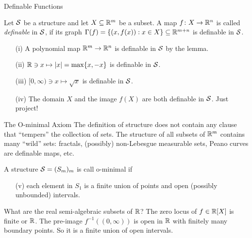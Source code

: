 \documentclass{beamer}
\begin{document}
\begin{frame}{Definable Functions}
  \begin{definition}
    Let ${\mathcal S}$ be a structure and let $X\subseteq{\mathbb{R}}^m$ be a subset.
    A map $f\colon X\rightarrow{\mathbb{R}}^n$ is
    called \emph{definable} in ${\mathcal S}$, if its graph $\Gamma(f) =
    \{(x,f(x)) : x\in X\}\subseteq{\mathbb{R}}^{m+n}$ is definable in ${\mathcal S}$.
  \end{definition}

  \begin{example} 
    \begin{enumerate}
    \item [(i)] A polynomial map ${\mathbb{R}}^m\rightarrow{\mathbb{R}}^n$ is
      definable in ${\mathcal S}$ by the lemma.
    \item[(ii)]  ${\mathbb{R}}\ni x\mapsto |x| =\max\{x,-x\}$ is definable in ${\mathcal S}$.
    \item[(iii)]  $[0,\infty)\ni x\mapsto \sqrt{x}$ is 
      definable in ${\mathcal S}$.
    \item[(iv)] The domain $X$ and the image $f(X)$ are both definable
      in ${\mathcal S}$. Just project!
    \end{enumerate}
  \end{example}
\end{frame}

\begin{frame}{The O-minimal Axiom}  
  The definition of structure does not contain
  any clause that ``tempers'' the collection of sets.
  The structure of all subsets of ${\mathbb{R}}^m$ contains many ``wild'' sets:
  fractals, (possibly) non-Lebesgue measurable sets, Peano curves are
  definable maps, etc.

  \begin{definition}
    A {structure} ${\mathcal S}=(S_m)_m$ is call \alert{o-minimal} if
    \begin{enumerate}
    \item [(v)] each 
      element in $S_1$ is a finite union of points and
      open (possibly unbounded) intervals.
    \end{enumerate}
  \end{definition}

  \begin{example}
    What are the real semi-algebraic subsets of ${\mathbb{R}}$? 
    The zero locus of $f\in{\mathbb{R}}[X]$ is finite or ${\mathbb{R}}$. The pre-image
    $f^{-1}((0,\infty))$ is open in ${\mathbb{R}}$  with finitely many
    boundary points. So it is a finite union of open intervals.
  \end{example}
\end{frame}
\end{document}

